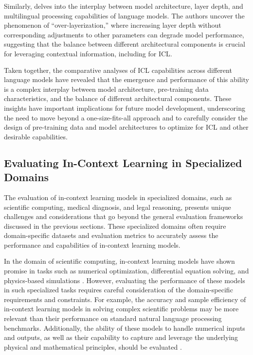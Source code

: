 \documentclass[11pt]{article}
\begin{document}
Similarly, \cite{ref300} delves into the interplay between model architecture, layer depth, and multilingual processing capabilities of language models. The authors uncover the phenomenon of ``over-layerization,'' where increasing layer depth without corresponding adjustments to other parameters can degrade model performance, suggesting that the balance between different architectural components is crucial for leveraging contextual information, including for ICL.

Taken together, the comparative analyses of ICL capabilities across different language models have revealed that the emergence and performance of this ability is a complex interplay between model architecture, pre-training data characteristics, and the balance of different architectural components. These insights have important implications for future model development, underscoring the need to move beyond a one-size-fits-all approach and to carefully consider the design of pre-training data and model architectures to optimize for ICL and other desirable capabilities.

\subsection{Evaluating In-Context Learning in Specialized Domains}

The evaluation of in-context learning models in specialized domains, such as scientific computing, medical diagnosis, and legal reasoning, presents unique challenges and considerations that go beyond the general evaluation frameworks discussed in the previous sections. These specialized domains often require domain-specific datasets and evaluation metrics to accurately assess the performance and capabilities of in-context learning models.

In the domain of scientific computing, in-context learning models have shown promise in tasks such as numerical optimization, differential equation solving, and physics-based simulations \cite{ref228}. However, evaluating the performance of these models in such specialized tasks requires careful consideration of the domain-specific requirements and constraints. For example, the accuracy and sample efficiency of in-context learning models in solving complex scientific problems may be more relevant than their performance on standard natural language processing benchmarks. Additionally, the ability of these models to handle numerical inputs and outputs, as well as their capability to capture and leverage the underlying physical and mathematical principles, should be evaluated \cite{ref228}.
\end{document}
